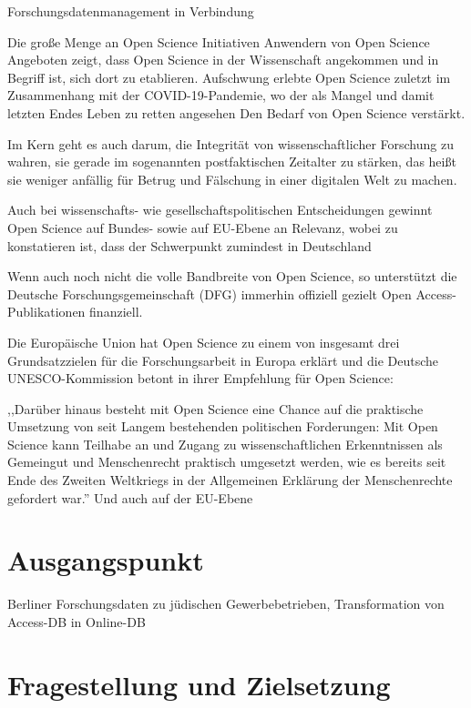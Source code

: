 \onehalfspacing

Forschungsdatenmanagement in Verbindung

Die große Menge an Open Science Initiativen Anwendern von Open Science Angeboten zeigt, dass Open Science in der Wissenschaft angekommen und in Begriff ist, sich dort zu etablieren. 
Aufschwung erlebte Open Science zuletzt im Zusammenhang mit der COVID-19-Pandemie, wo der als Mangel und damit letzten Endes Leben zu retten angesehen Den Bedarf von Open Science verstärkt. 



 Im Kern geht es auch darum, die Integrität von wissenschaftlicher Forschung zu wahren, sie gerade im sogenannten postfaktischen Zeitalter zu stärken, das heißt sie weniger anfällig für Betrug und Fälschung in einer digitalen Welt zu machen. 
  

 

Auch bei wissenschafts- wie gesellschaftspolitischen Entscheidungen gewinnt Open Science auf Bundes- sowie auf EU-Ebene an Relevanz, wobei zu konstatieren ist, dass der Schwerpunkt zumindest in Deutschland 


Wenn auch noch nicht die volle Bandbreite von Open Science, so unterstützt die Deutsche Forschungsgemeinschaft (DFG) immerhin offiziell gezielt Open Access-Publikationen finanziell. 

Die Europäische Union hat Open Science zu einem von insgesamt drei Grundsatzzielen für die Forschungsarbeit in Europa erklärt  und die  Deutsche UNESCO-Kommission betont in ihrer Empfehlung für Open Science:

,,Darüber hinaus besteht mit Open Science eine Chance auf die praktische Umsetzung von seit Langem bestehenden politischen Forderungen: Mit Open Science kann Teilhabe an und Zugang zu wissenschaftlichen Erkenntnissen als Gemeingut und Menschenrecht praktisch umgesetzt werden, wie es bereits seit Ende des Zweiten Weltkriegs in der Allgemeinen Erklärung der Menschenrechte gefordert war.''
Und auch auf der EU-Ebene 

\section{Ausgangspunkt}

Berliner Forschungsdaten zu jüdischen Gewerbebetrieben, Transformation von Access-DB in Online-DB

\section{Fragestellung und Zielsetzung}


